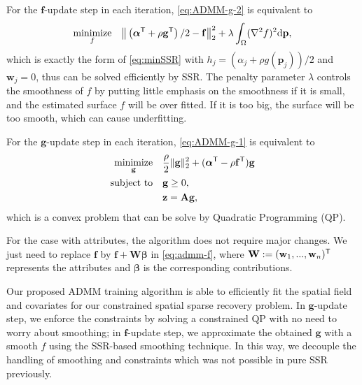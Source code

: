 For the $\mathbf f$-update step in each iteration, \eqref{eq:ADMM-g-2} is equivalent to
\begin{equation}\label{eq:admm-f}
	\underset{f}{\text{minimize}}\quad \big\| \left(\boldsymbol{\alpha}^{\sf T} + \rho \mathbf g^{\sf T}\right)/2 - \mathbf f \big\|_2^2 + \lambda\int_\Omega(\nabla^2 f)^2\mathrm{d}\mathbf p,
\end{equation}
which is exactly the form of \eqref{eq:minSSR} with $h_j = \left(\alpha_j + \rho g(\mathbf p_j)\right)/2$ and $\mathbf w_j = 0$, thus can be solved efficiently by SSR. 
The penalty parameter $\lambda$ controls the smoothness of $f$ by putting little emphasis on the smoothness if it is small, and the estimated surface $f$ will be over fitted. If it is too big, the surface will be too smooth, which can cause underfitting.


For the $\mathbf g$-update step in each iteration, \eqref{eq:ADMM-g-1} is equivalent to
\begin{equation}
\label{eq:g-QR}
\begin{split}
	\underset{\mathbf g}{\mbox{minimize}} \quad 		
	& \frac{\rho}{2}\|\mathbf g\|_2^2 + (\boldsymbol{\alpha}^{\sf T} - \rho \mathbf f^{\sf T}) \mathbf g\\
	\mbox{subject to} \quad 
	& \mathbf g \geq 0,\\
	& \mathbf z= \mathbf{Ag},
\end{split}
\end{equation}
which is a convex problem that can be solve by Quadratic Programming (QP).

For the case with attributes, the algorithm does not require major changes. We just need to replace $\mathbf f$ by $\mathbf f + \mathbf W \boldsymbol{\beta}$ in \eqref{eq:admm-f}, where $\mathbf W := (\mathbf w_1, ..., \mathbf w_n)^{\sf T}$ represents the attributes and $\boldsymbol{\beta}$ is the corresponding contributions. 

Our proposed ADMM training algorithm is able to efficiently fit the spatial field and covariates for our constrained spatial sparse recovery problem. In $\mathbf g$-update step, we enforce the constraints by solving a constrained QP with no need to worry about smoothing; in $\mathbf f$-update step, we approximate the obtained $\mathbf g$ with a smooth $f$ using the SSR-based smoothing technique. In
this way, we decouple the  handling of smoothing and constraints which was not possible in pure SSR previously.


